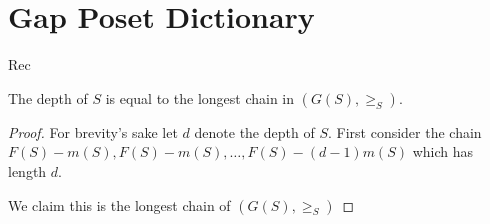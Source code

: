 \documentclass[11pt]{article}
\begin{document}
\section{Gap Poset Dictionary}

Rec
\begin{proposition}
    The depth of \(S\) is equal to the longest chain in \((G(S), \ge_S)\).
\end{proposition}
\begin{proof}
    For brevity's sake let \(d\) denote the depth of \(S\).
    First consider the chain \(F(S) - m(S), F(S) - m(S), \dots, F(S) - (d-1) m(S)\) which has length \(d\). 

    We claim this is the longest chain of \((G(S), \ge_S)\)
\end{proof}

\end{document}
